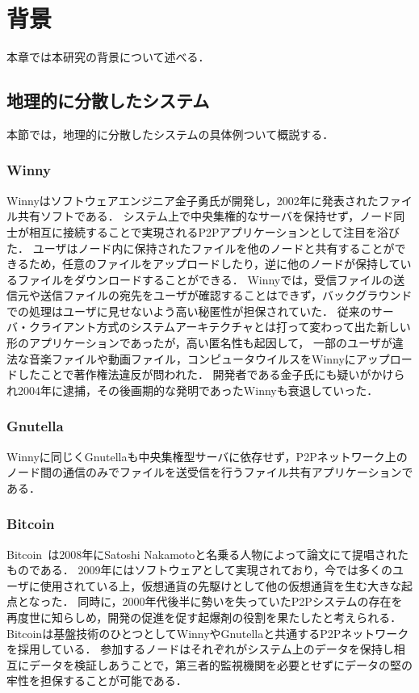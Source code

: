 \chapter{背景}
\label{background}

本章では本研究の背景について述べる．

\section{地理的に分散したシステム}
\label{background:geographically-disdtributed-system}
本節では，地理的に分散したシステムの具体例ついて概説する．

\subsection{Winny}
Winnyはソフトウェアエンジニア金子勇氏が開発し，2002年に発表されたファイル共有ソフトである．
システム上で中央集権的なサーバを保持せず，ノード同士が相互に接続することで実現されるP2Pアプリケーションとして注目を浴びた．
ユーザはノード内に保持されたファイルを他のノードと共有することができるため，任意のファイルをアップロードしたり，逆に他のノードが保持しているファイルをダウンロードすることができる．
Winnyでは，受信ファイルの送信元や送信ファイルの宛先をユーザが確認することはできず，バックグラウンドでの処理はユーザに見せないよう高い秘匿性が担保されていた．
従来のサーバ・クライアント方式のシステムアーキテクチャとは打って変わって出た新しい形のアプリケーションであったが，高い匿名性も起因して，
一部のユーザが違法な音楽ファイルや動画ファイル，コンピュータウイルスをWinnyにアップロードしたことで著作権法違反が問われた．
開発者である金子氏にも疑いがかけられ2004年に逮捕，その後画期的な発明であったWinnyも衰退していった．

\subsection{Gnutella}
Winnyに同じくGnutellaも中央集権型サーバに依存せず，P2Pネットワーク上のノード間の通信のみでファイルを送受信を行うファイル共有アプリケーションである．

\subsection{Bitcoin}
Bitcoin~\cite{Bitcoin}は2008年にSatoshi Nakamotoと名乗る人物によって論文にて提唱されたものである．
2009年にはソフトウェアとして実現されており，今では多くのユーザに使用されている上，仮想通貨の先駆けとして他の仮想通貨を生む大きな起点となった．
同時に，2000年代後半に勢いを失っていたP2Pシステムの存在を再度世に知らしめ，開発の促進を促す起爆剤の役割を果たしたと考えられる．
Bitcoinは基盤技術のひとつとしてWinnyやGnutellaと共通するP2Pネットワークを採用している．
参加するノードはそれぞれがシステム上のデータを保持し相互にデータを検証しあうことで，第三者的監視機関を必要とせずにデータの堅の牢性を担保することが可能である．

